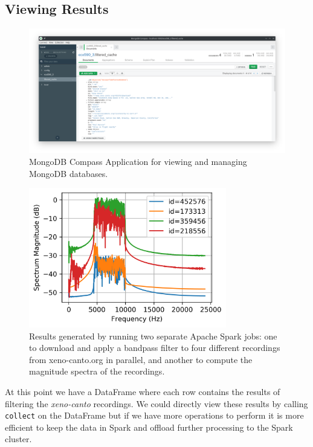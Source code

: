 \documentclass[conference,twoside]{IEEEtran}
\newcommand{\code}[1]{\texttt{#1}}
\begin{document}
\subsection{Viewing Results}

\begin{figure}  %
  \centering
  \includegraphics[width=\textwidth]{compass_screenshot}
  \caption{MongoDB Compass Application for viewing and managing MongoDB databases.}
  \label{fig:compass}
\end{figure}


\begin{figure}
  \centering
  \includegraphics[width=3.4in]{output_spectrum}
  \caption{Results generated by running two separate Apache Spark jobs: one to download and apply a bandpass filter to four different recordings from xeno-canto.org in parallel, and another to compute the magnitude spectra of the recordings.}
  \label{fig:spectra}
\end{figure}

At this point we have a DataFrame where each row contains the results of filtering the \textit{xeno-canto} recordings. We could directly view these results by calling \code{collect} on the DataFrame but if we have more operations to perform it is more efficient to keep the data in Spark and offload further processing to the Spark cluster.
\end{document}
